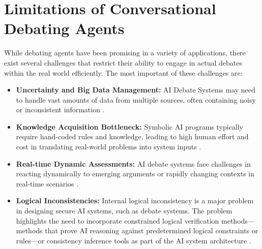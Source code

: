 \documentclass[conference]{IEEEtran}
\begin{document}
\section{Limitations of Conversational Debating Agents}
While debating agents have been promising in a variety of applications, there exist several challenges that restrict their ability to engage in actual debates within the real world efficiently. The most important of these challenges are:
\begin{itemize}
    \item \textbf{Uncertainty and Big Data Management:} AI Debate Systems may need to handle vast amounts of data from multiple sources, often containing noisy or inconsistent information \cite{kasif2024trilogy}.
    
    \item \textbf{Knowledge Acquisition Bottleneck:} Symbolic AI programs typically require hand-coded rules and knowledge, leading to high human effort and cost in translating real-world problems into system inputs \cite{kasif2024trilogy}.
    
    \item \textbf{Real-time Dynamic Assessments:} AI debate systems face challenges in reacting dynamically to emerging arguments or rapidly changing contexts in real-time scenarios \cite{kasif2024trilogy}.
    
    \item \textbf{Logical Inconsistencies:} Internal logical inconsistency is a major problem in designing secure AI systems, such as debate systems. The problem highlights the need to incorporate constrained logical verification methods—methods that prove AI reasoning against predetermined logical constraints or rules—or consistency inference tools as part of the AI system architecture \cite{ilkou2020symbolic}.
\end{itemize}
\end{document}
